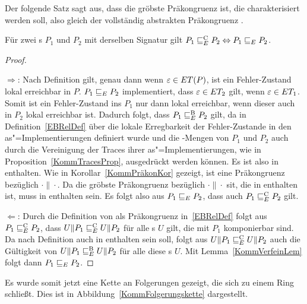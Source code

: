 Der folgende Satz sagt aus, dass \ERel{} die gröbste Präkongruenz ist, die
charakterisiert werden soll, also gleich der vollständig abstrakten
Präkongruenz \ECRel{}.

\begin{Satz}
  \label{KommVollAbstraktSatz}
  Für zwei \MEIO{}s $P_1$ und $P_2$ mit derselben Signatur gilt $P_1 \sqsubseteq  _E^\mathrm{C}
  P_2\Leftrightarrow P_1 \sqsubseteq  _E{} P_2$.
\end{Satz}

\begin{proof}\mbox{}\\

  \glqq$\Rightarrow$\grqq: Nach Definition gilt, genau dann wenn
  $\varepsilon\in ET (P)$, ist ein Fehler-Zustand lokal erreichbar in $P$. $P_1
   \sqsubseteq  _E P_2$ implementiert, dass $\varepsilon\in ET _2$ gilt, wenn
  $\varepsilon\in ET _1$. Somit ist ein Fehler-Zustand ins $P_1$ nur dann lokal
  erreichbar, wenn dieser auch in $P_2$ lokal erreichbar ist. Dadurch folgt,
  dass $P_1 \sqsubseteq  _E^\mathrm{B} P_2$ gilt, da \EBRel{} in Definition~\ref{EBRelDef} über die
  lokale Erregbarkeit der Fehler-Zustande in den as"=Implementierungen
  definiert wurde und die \ET{}-Mengen von $P_1$ und $P_2$ auch durch die
  Vereinigung der Traces ihrer as"=Implementierungen, wie in
  Proposition~\ref{KommTracesProp}, ausgedrückt werden können. Es ist also
  \ERel{} in \EBRel{} enthalten. Wie in Korollar~\ref{KommPräkonKor} gezeigt,
  ist \ERel{} eine Präkongruenz bezüglich $\cdot\|\cdot$. Da \ECRel{} die
  gröbste Präkongruenz bezüglich $\cdot\|\cdot$ sit, die in \EBRel{} enthalten
  ist, muss \ERel{} in \ECRel{} enthalten sein. Es folgt also aus $P_1 \sqsubseteq  _E{}
  P_2$, dass auch $P_1 \sqsubseteq  _E^\mathrm{C}{} P_2$ gilt.

  \glqq$\Leftarrow$\grqq: Durch die Definition von \ECRel{} als Präkongruenz
  in~\ref{EBRelDef} folgt aus $P_1 \sqsubseteq  _E^\mathrm{C}{} P_2$, dass $U\|P_1 \sqsubseteq  _E^\mathrm{C} U\|P_2$ für
  alle \MEIO{}s $U$ gilt, die mit $P_1$ komponierbar sind. Da \ECRel{} nach
  Definition auch in \EBRel{} enthalten sein soll, folgt aus $U\|P_1 \sqsubseteq  _E^\mathrm{C}{}
  U\|P_2$ auch die Gültigkeit von $U\|P_1 \sqsubseteq  _E^\mathrm{B}{}U\|P_2$ für alle diese
  \MEIO{}s $U$. Mit Lemma~\ref{KommVerfeinLem} folgt dann $P_1 \sqsubseteq  _E{} P_2$.
\end{proof}

Es wurde somit jetzt eine Kette an Folgerungen gezeigt, die sich zu einem Ring
schließt. Dies ist in Abbildung~\ref{KommFolgerungskette} dargestellt.

